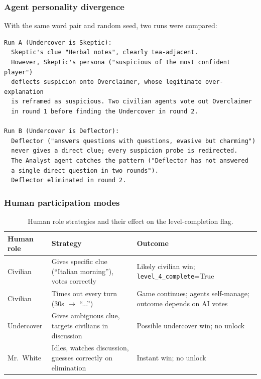 \documentclass[11pt,a4paper]{article}
\begin{document}
\subsubsection{Agent personality divergence}

With the same word pair and random seed, two runs were compared:

\begin{lstlisting}
Run A (Undercover is Skeptic):
  Skeptic's clue "Herbal notes", clearly tea-adjacent.
  However, Skeptic's persona ("suspicious of the most confident player")
  deflects suspicion onto Overclaimer, whose legitimate over-explanation
  is reframed as suspicious. Two civilian agents vote out Overclaimer
  in round 1 before finding the Undercover in round 2.

Run B (Undercover is Deflector):
  Deflector ("answers questions with questions, evasive but charming")
  never gives a direct clue; every suspicion probe is redirected.
  The Analyst agent catches the pattern ("Deflector has not answered
  a single direct question in two rounds").
  Deflector eliminated in round 2.
\end{lstlisting}

\subsubsection{Human participation modes}

\begin{table}[H]
\centering
\small
\renewcommand{\arraystretch}{1.25}
\begin{tabularx}{\linewidth}{l X X}
\toprule
\textbf{Human role} & \textbf{Strategy} & \textbf{Outcome} \\
\midrule
Civilian & Gives specific clue (``Italian morning''), votes correctly & Likely civilian win; \texttt{level\_4\_complete}=True \\
Civilian & Times out every turn (30s $\rightarrow$ ``...'') & Game continues; agents self-manage; outcome depends on AI votes \\
Undercover & Gives ambiguous clue, targets civilians in discussion & Possible undercover win; no unlock \\
Mr.\ White & Idles, watches discussion, guesses correctly on elimination & Instant win; no unlock \\
\bottomrule
\end{tabularx}
\caption{Human role strategies and their effect on the level-completion flag.}
\end{table}
\end{document}
